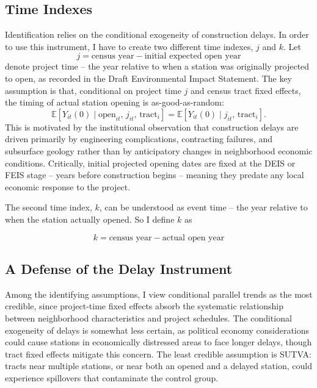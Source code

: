 \documentclass[12pt]{article}
\begin{document}
\subsection{Time Indexes}\label{subsec:time_index}
Identification relies on the conditional exogeneity of construction delays. In order to use this instrument, I have to create two different time indexes, $j$ and $k$. Let 
\begin{equation}\label{eq:proj_time}
    j = \text{census year} - \text{initial expected open year}
\end{equation} 
denote project time  --  the year relative to when a station was originally projected to open, as recorded in the Draft Environmental Impact Statement. The key assumption is that, conditional on project time $j$ and census tract fixed effects, the timing of actual station opening is as-good-as-random:
$$\mathbb{E}[Y_{it}(0) \mid \text{open}_{it},\, j_{it},\, \text{tract}_i] = \mathbb{E}[Y_{it}(0) \mid j_{it},\, \text{tract}_i].$$
This is motivated by the institutional observation that construction delays are driven primarily by engineering complications, contracting failures, and subsurface geology rather than by anticipatory changes in neighborhood economic conditions. Critically, initial projected opening dates are fixed at the DEIS or FEIS stage  --  years before construction begins  --  meaning they predate any local economic response to the project.

The second time index, $k$, can be understood as event time  --  the year relative to when the station actually opened. So I define $k$ as

\begin{equation}\label{eq:event_time}
    k = \text{census year}-\text{actual open year}
\end{equation}
\subsection{A Defense of the Delay Instrument}
Among the identifying assumptions, I view conditional parallel trends as the most credible, since project-time fixed effects absorb the systematic relationship between neighborhood characteristics and project schedules. The conditional exogeneity of delays is somewhat less certain, as political economy considerations could cause stations in economically distressed areas to face longer delays, though tract fixed effects mitigate this concern. The least credible assumption is SUTVA: tracts near multiple stations, or near both an opened and a delayed station, could experience spillovers that contaminate the control group.
\end{document}
